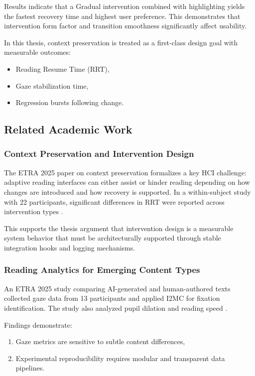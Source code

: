 Results indicate that a Gradual intervention combined with highlighting yields the fastest recovery time and highest user preference. This demonstrates that intervention form factor and transition smoothness significantly affect usability.  

In this thesis, context preservation is treated as a first-class design goal with measurable outcomes:
\begin{itemize}
    \item Reading Resume Time (RRT),
    \item Gaze stabilization time,
    \item Regression bursts following change.
\end{itemize}

\subsection{Related Academic Work}

\subsubsection{Context Preservation and Intervention Design}
The ETRA 2025 paper on context preservation formalizes a key HCI challenge: adaptive reading interfaces can either assist or hinder reading depending on how changes are introduced and how recovery is supported. In a within-subject study with 22 participants, significant differences in RRT were reported across intervention types \cite{ref2}.  

This supports the thesis argument that intervention design is a measurable system behavior that must be architecturally supported through stable integration hooks and logging mechanisms.

\subsubsection{Reading Analytics for Emerging Content Types}
An ETRA 2025 study comparing AI-generated and human-authored texts collected gaze data from 13 participants and applied I2MC for fixation identification. The study also analyzed pupil dilation and reading speed \cite{ref2}.  

Findings demonstrate:
\begin{enumerate}
    \item Gaze metrics are sensitive to subtle content differences,
    \item Experimental reproducibility requires modular and transparent data pipelines.
\end{enumerate}


